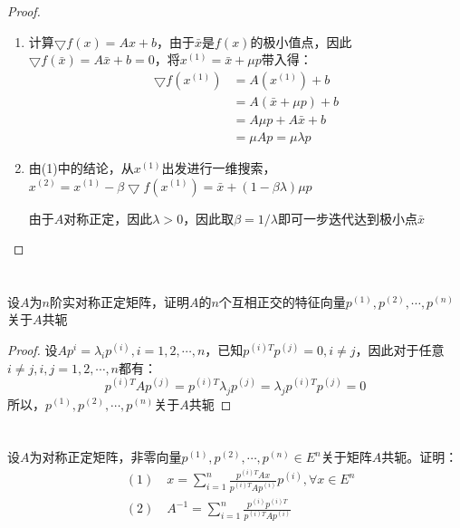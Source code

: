 \documentclass[a4paper]{article}
\begin{document}
\begin{proof}
	\begin{enumerate}[(1)]
		\item 计算$\bigtriangledown f(x)=Ax+b$，由于$\bar{x}$是$f(x)$的极小值点，因此$\bigtriangledown f(\bar{x})=A\bar{x}+b=0$，将$x^{(1)}=\bar{x}+\mu p$带入得：
		\begin{equation}
		\begin{aligned}
		\bigtriangledown f(x^{(1)})&=A(x^{(1)})+b \\
		&=A(\bar{x}+\mu p)+b \\
		&=A\mu p +A\bar{x}+b \\
		&=\mu A p=\mu \lambda p
		\end{aligned}
		\end{equation}
		
		\item 由(1)中的结论，从$x^{(1)}$出发进行一维搜索，$x^{(2)}=x^{(1)}-\beta\bigtriangledown f(x^{(1)})=\bar{x}+(1-\beta\lambda)\mu p$
		
		由于$A$对称正定，因此$\lambda>0$，因此取$\beta=1/\lambda$即可一步迭代达到极小点$\bar{x}$
	\end{enumerate}
\end{proof}

\section{}
设$A$为$n$阶实对称正定矩阵，证明$A$的$n$个互相正交的特征向量$p^{(1)},p^{(2)},\cdots,p^{(n)}$关于$A$共轭

\begin{proof}
	设$Ap^{i}=\lambda_ip^{(i)},i=1,2,\cdots,n$，已知$p^{(i)T}p^{(j)}=0,i\ne j$，因此对于任意$i\ne j,i,j=1,2,\cdots,n$都有：
	\begin{equation}
	p^{(i)T}Ap^{(j)}=p^{(i)T}\lambda_jp^{(j)}=\lambda_jp^{(i)T}p^{(j)}=0
	\end{equation}
	所以，$p^{(1)},p^{(2)},\cdots,p^{(n)}$关于$A$共轭
\end{proof}

\section{}
设$A$为对称正定矩阵，非零向量$p^{(1)},p^{(2)},\cdots,p^{(n)}\in E^n$关于矩阵$A$共轭。证明：
\begin{equation}
\begin{aligned}
&(1)\quad x=\sum_{i=1}^{n}\frac{p^{(i)T}Ax}{p^{(i)T}Ap^{(i)}}p^{(i)},\forall x\in E^n \\
&(2)\quad A^{-1}=\sum_{i=1}^{n}\frac{p^{(i)}p^{(i)T}}{p^{(i)T}Ap^{(i)}}
\end{aligned}
\end{equation}
\end{document}
